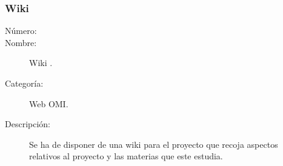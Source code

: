 \subsubsection{Wiki}
\begin{framed}
	\begin{description}
		\item [Número:] \cn
		\item [Nombre:] Wiki .
		\item [Categoría:] Web OMI.
		\item [Descripción:]  Se ha de disponer de una wiki para el proyecto que recoja aspectos relativos al proyecto y las materias que este estudia.
	\end {description}
\end{framed}



